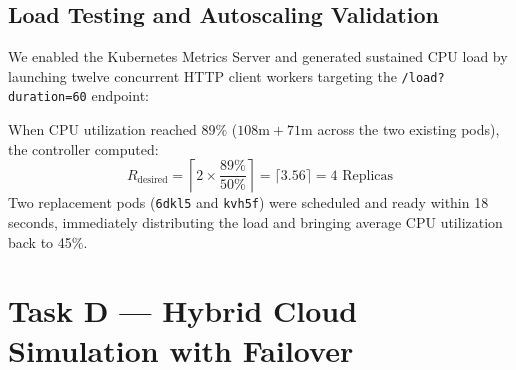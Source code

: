 \documentclass[conference]{IEEEtran}
\begin{document}
\subsection{Load Testing and Autoscaling Validation}
We enabled the Kubernetes Metrics Server and generated sustained CPU load by launching twelve concurrent HTTP client workers targeting the \texttt{/load?duration=60} endpoint:

\begin{table}[htbp]
\centering
\caption{Measured HPA Scaling Progression Under Load}
\label{tab:hpa_stages}
\end{table}

When CPU utilization reached 89\% ($108\text{m} + 71\text{m}$ across the two existing pods), the controller computed:
\begin{equation}
R_{\text{desired}} = \left\lceil 2 \times \frac{89\%}{50\%} \right\rceil = \lceil 3.56 \rceil = 4 \text{ Replicas}
\end{equation}
Two replacement pods (\texttt{6dkl5} and \texttt{kvh5f}) were scheduled and ready within 18 seconds, immediately distributing the load and bringing average CPU utilization back to 45\%.

\section{Task D --- Hybrid Cloud Simulation with Failover}
\end{document}
